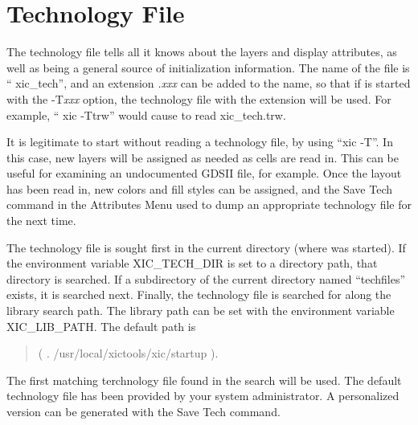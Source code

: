 
\appendix
\chapter{Technology File}
\label{techfile}
The technology file tells {\Xic} all it knows about the layers and
display attributes, as well as being a general source of
initialization information.  The name of the file is ``{\vt
xic\_tech}'', and an extension {\it .xxx\/} can be added to the name,
so that if {\Xic} is started with the {\vt -T}{\it xxx\/} option, the
technology file with the extension will be used.  For example, ``{\vt
xic -Ttrw}'' would cause {\Xic} to read {\vt xic\_tech.trw}.

It is legitimate to start {\Xic} without reading a technology file, by
using ``{\vt xic -T}''.  In this case, new layers will be assigned as
needed as cells are read in.  This can be useful for examining an
undocumented GDSII file, for example.  Once the layout has been read
in, new colors and fill styles can be assigned, and the {\cb Save
Tech} command in the {\cb Attributes Menu} used to dump an appropriate
technology file for the next time.

The technology file is sought first in the current directory (where
{\Xic} was started).  If the environment variable {\et XIC\_TECH\_DIR}
is set to a directory path, that directory is searched.  If a
subdirectory of the current directory named ``{\vt techfiles}''
exists, it is searched next.  Finally, the technology file is searched
for along the library search path.  The library path can be set with
the environment variable {\et XIC\_LIB\_PATH}.  The default path is
\begin{quote}
 {\vt ( . /usr/local/xictools/xic/startup )}.
\end{quote}
The first matching terchnology file found in the search will be used. 
The default technology file has been provided by your system
administrator.  A personalized version can be generated with the {\cb
Save Tech} command.

